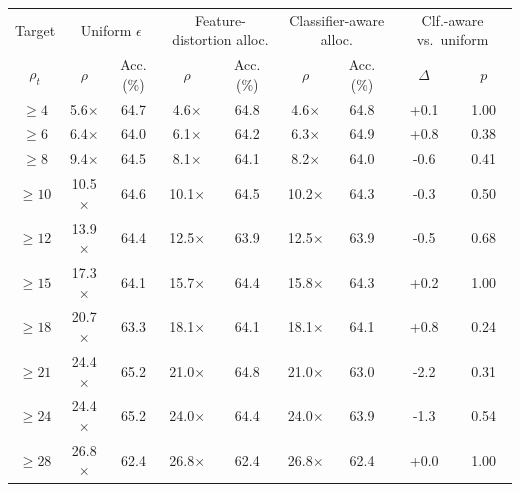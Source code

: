 \begin{tabular}{ccccccccc}
\toprule
Target & \multicolumn{2}{c}{Uniform $\epsilon$} & \multicolumn{2}{c}{Feature-distortion alloc.} & \multicolumn{2}{c}{Classifier-aware alloc.} & \multicolumn{2}{c}{Clf.-aware vs.\ uniform} \\
$\rho_t$ & $\rho$ & Acc. (\%) & $\rho$ & Acc. (\%) & $\rho$ & Acc. (\%) & $\Delta$ & $p$ \\
\midrule
$\ge4$ & 5.6$\times$ & 64.7 & 4.6$\times$ & 64.8 & 4.6$\times$ & 64.8 & +0.1 & 1.00 \\
$\ge6$ & 6.4$\times$ & 64.0 & 6.1$\times$ & 64.2 & 6.3$\times$ & 64.9 & +0.8 & 0.38 \\
$\ge8$ & 9.4$\times$ & 64.5 & 8.1$\times$ & 64.1 & 8.2$\times$ & 64.0 & -0.6 & 0.41 \\
$\ge10$ & 10.5$\times$ & 64.6 & 10.1$\times$ & 64.5 & 10.2$\times$ & 64.3 & -0.3 & 0.50 \\
$\ge12$ & 13.9$\times$ & 64.4 & 12.5$\times$ & 63.9 & 12.5$\times$ & 63.9 & -0.5 & 0.68 \\
$\ge15$ & 17.3$\times$ & 64.1 & 15.7$\times$ & 64.4 & 15.8$\times$ & 64.3 & +0.2 & 1.00 \\
$\ge18$ & 20.7$\times$ & 63.3 & 18.1$\times$ & 64.1 & 18.1$\times$ & 64.1 & +0.8 & 0.24 \\
$\ge21$ & 24.4$\times$ & 65.2 & 21.0$\times$ & 64.8 & 21.0$\times$ & 63.0 & -2.2 & 0.31 \\
$\ge24$ & 24.4$\times$ & 65.2 & 24.0$\times$ & 64.4 & 24.0$\times$ & 63.9 & -1.3 & 0.54 \\
$\ge28$ & 26.8$\times$ & 62.4 & 26.8$\times$ & 62.4 & 26.8$\times$ & 62.4 & +0.0 & 1.00 \\
\bottomrule
\end{tabular}

